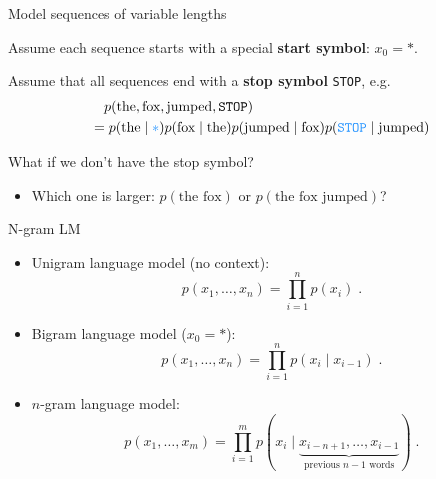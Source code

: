 \documentclass[usenames,dvipsnames,notes,11pt,aspectratio=169,hyperref={colorlinks=true, linkcolor=blue}]{beamer}
\newcommand{\pdfnote}[1]{}
\begin{document}
\begin{frame}
    {Model sequences of variable lengths}

    Assume each sequence starts with a special \textbf{start symbol}: $x_0=*$.
    \medskip

    Assume that all sequences end with a \textbf{stop symbol} \texttt{STOP}, e.g.
    \begin{align*}
        &\quad p(\text{the}, \text{fox}, \text{jumped}, \texttt{STOP})\\
         &= p(\text{the}\mid {\color{blue}*})
         p(\text{fox}\mid \text{the})
         p(\text{jumped}\mid \text{fox})
         p({\color{blue}\texttt{STOP}}\mid \text{jumped})
    \end{align*}

    {What if we don't have the stop symbol?}\\\pause
    \begin{itemize}
        \item Which one is larger: $p(\text{the fox})$ or $p(\text{the fox jumped})$?
    \end{itemize}

\end{frame}

\begin{frame}
    {N-gram LM}
    \begin{itemize}
        \item Unigram language model (no context):
            $$
            p(x_1,\ldots, x_n) = \prod_{i=1}^n p(x_i) \;.
            $$
        \item Bigram language model ($x_0=*$):
            $$
            p(x_1,\ldots, x_n) = \prod_{i=1}^n p(x_i\mid x_{i-1}) \;.
            $$
        \item $n$-gram language model:
            $$
            p(x_1,\ldots, x_m) = \prod_{i=1}^m p(x_i\mid \underbrace{
                x_{i-n+1},\ldots, x_{i-1}
            }_{\textstyle\text{previous $n-1$ words}} )
            \;.
            $$
    \end{itemize}
\end{frame}
\end{document}
